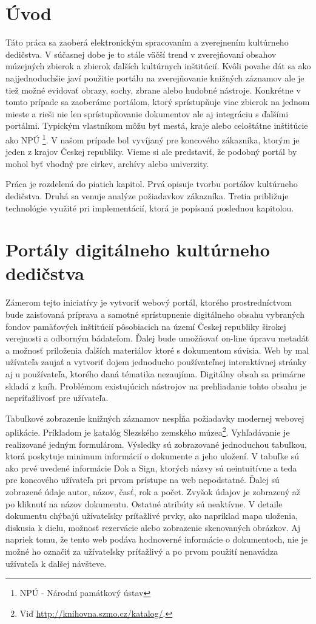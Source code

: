 \documentclass[
  print, %
  table,   %
  lof,     %
  nolot,     %
]{fithesis3}
\begin{document}
\chapter{Úvod}
Táto práca sa zaoberá elektronickým spracovaním a zverejnením kultúrneho dedičstva. V súčasnej dobe je to stále väčší trend v zverejňovaní obsahov múzejných zbierok a zbierok ďalších kultúrnych inštitúcií. Kvôli povahe dát sa ako najjednoduchšie javí použitie portálu na zverejňovanie knižných záznamov ale je tiež možné evidovať obrazy, sochy, zbrane alebo hudobné nástroje. Konkrétne v tomto prípade sa zaoberáme portálom, ktorý sprístupňuje viac zbierok na jednom mieste a rieši nie len sprístupňovanie dokumentov ale aj integráciu s ďalšími portálmi. Typickým vlastníkom môžu byť mestá, kraje alebo celoštátne inštitúcie ako NPÚ \footnote{NPÚ - Národní památkový ústav}. V našom prípade bol vyvíjaný pre koncového zákazníka, ktorým je jeden z krajov Českej republiky. Vieme si ale predstaviť, že podobný portál by mohol byť vhodný pre cirkev, archívy alebo univerzity.

Práca je rozdelená do piatich kapitol. Prvá opisuje tvorbu portálov kultúrneho dedičstva. Druhá sa venuje analýze požiadavkov zákazníka. Tretia približuje technológie využité pri implementácií, ktorá je popísaná poslednou kapitolou. 
\chapter{Portály digitálneho kultúrneho dedičstva}	
Zámerom tejto iniciatívy je vytvoriť webový portál, ktorého prostredníctvom bude zaisťovaná príprava a samotné sprístupnenie digitálneho obsahu vybraných fondov pamäťových inštitúcií pôsobiacich na území Českej republiky širokej verejnosti a odborným bádateľom. Ďalej bude umožňovať on-line úpravu metadát a možnosť priloženia ďalších materiálov ktoré s dokumentom súvisia. Web by mal užívateľa zaujať a vytvoriť dojem jednoducho používateľnej interaktívnej stránky aj u používateľa, ktorého daná tématika nezaujíma. Digitálny obsah sa primárne skladá z kníh. Problémom existujúcich nástrojov na prehliadanie tohto obsahu je nepríťažlivosť pre užívateľa. 

Tabuľkové zobrazenie knižných záznamov nespĺňa požiadavky modernej webovej aplikácie. Príkladom je katalóg Slezského zemského múzea\footnote{Viď \url{http://knihovna.szmo.cz/katalog/}.}. Vyhľadávanie je realizované jedným formulárom. Výsledky sú zobrazované jednoduchou tabuľkou, ktorá poskytuje minimum informácií o dokumente a jeho uložení. V tabuľke sú ako prvé uvedené informácie Dok a Sign, ktorých názvy sú neintuitívne a teda pre koncového užívateľa pri prvom prístupe na web nepodstatné. Ďalej sú zobrazené údaje autor, názov, časť, rok a počet. Zvyšok údajov je zobrazený až po kliknutí na názov dokumentu. Ostatné atribúty sú neaktívne. V detaile dokumentu chýbajú užívateľsky príťažlivé prvky, ako napríklad mapa uloženia, diskusia k dielu, možnosť rezervácie alebo zobrazenie skenovaných obrázkov. Aj napriek tomu, že tento web podáva hodnoverné informácie o dokumentoch, nie je možné ho označiť za užívateľsky príťažlivý a po prvom použití nenavádza užívateľa k ďalšej návšteve.
\end{document}
